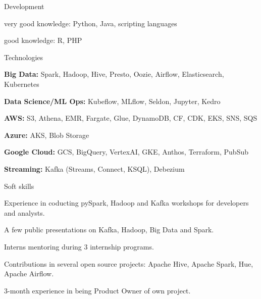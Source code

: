 

\begin{cventries}

  \cventry
    {Development} %
    {} %
    {} %
    {} %
    {
      \begin{cvitems} %
        \item {very good knowledge: Python, Java, scripting languages}
        \item {good knowledge: R, PHP}
      \end{cvitems}
    }
    
  \cventry
    {Technologies} %
    {} %
    {} %
    {} %
    {
      \begin{cvitems} %
        \item {\textbf{Big Data:} Spark, Hadoop, Hive, Presto, Oozie, Airflow, Elasticsearch, Kubernetes}
        \item {\textbf{Data Science/ML Ops:} Kubeflow, MLflow, Seldon, Jupyter, Kedro}
        \item {\textbf{AWS:} S3, Athena, EMR, Fargate, Glue, DynamoDB, CF, CDK, EKS, SNS, SQS}
        \item {\textbf{Azure:} AKS, Blob Storage}
        \item {\textbf{Google Cloud:} GCS, BigQuery, VertexAI, GKE, Anthos, Terraform, PubSub}
        \item {\textbf{Streaming:} Kafka (Streams, Connect, KSQL), Debezium}
      \end{cvitems}
    }
    
  \cventry
    {Soft skills} %
    {} %
    {} %
    {} %
    {
      \begin{cvitems} %
        \item {Experience in coducting pySpark, Hadoop and Kafka workshops for developers and analysts.}
        \item {A few public presentations on Kafka, Hadoop, Big Data and Spark.}
        \item {Interns mentoring during 3 internship programs.}
        \item {Contributions in several open source projects: Apache Hive, Apache Spark, Hue, Apache Airflow.}
        \item{3-month experience in being Product Owner of own project.}
      \end{cvitems}
    }
    

\end{cventries}
